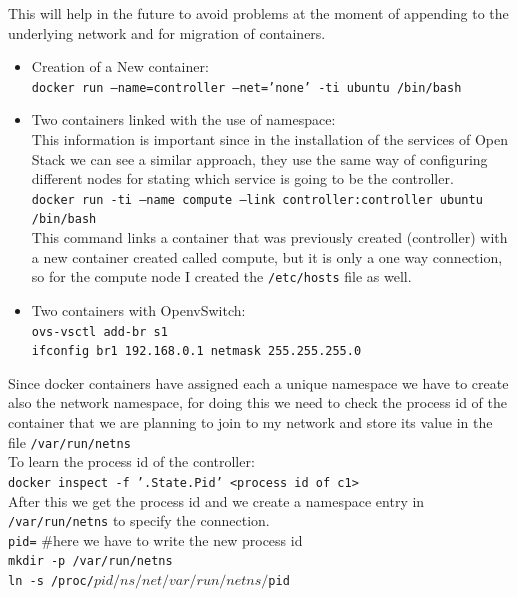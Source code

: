 This will help in the future to avoid problems at the moment of appending to the underlying network and for migration of containers.\\
\begin{itemize}
\item Creation of a New container:\\
\texttt{docker run --name=controller --net='none' -ti ubuntu /bin/bash}\\
\item Two containers linked with the use of namespace:\\
This information is important since in the installation of the services of Open Stack we can see a similar approach, they use the same way of configuring different nodes for stating which service is going to be the controller.\\
\texttt{docker run -ti --name compute --link controller:controller ubuntu /bin/bash}\\
This command links a container that was previously created (controller) with a new container created called compute, but it is only a one way connection, so for the compute node I created  the \texttt{/etc/hosts} file as well.
\item Two containers with OpenvSwitch:\\
\texttt{ovs-vsctl add-br s1}\\
\texttt{ifconfig br1 192.168.0.1 netmask 255.255.255.0}

\end{itemize}

Since docker containers have assigned each a unique namespace we have to create also the network namespace, for doing this we need to check the process id of the container that we are planning to join to my network and store its value in the file \texttt{/var/run/netns}\\

To learn the process id of the controller:\\
\texttt{docker inspect -f '{{.State.Pid}}' <process id of c1>}\\
After this we get the process id and we create a namespace entry in \texttt{/var/run/netns} to specify the connection.\\

\texttt{pid=} #here we have to write the new process id\\
\texttt{mkdir -p /var/run/netns}\\
\texttt{ln -s /proc/$pid/ns/net /var/run/netns/$pid}\\

